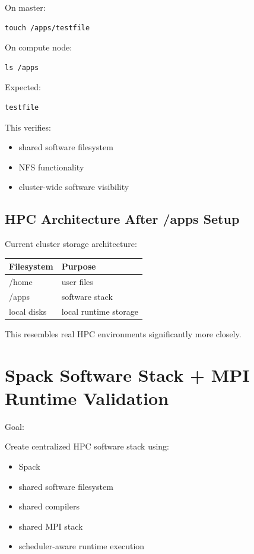 \documentclass[11pt]{article}
\begin{document}
On master:

\begin{verbatim}
touch /apps/testfile
\end{verbatim}

On compute node:

\begin{verbatim}
ls /apps
\end{verbatim}

Expected:

\begin{verbatim}
testfile
\end{verbatim}

This verifies:

\begin{itemize}
\item shared software filesystem
\item NFS functionality
\item cluster-wide software visibility
\end{itemize}
\subsection{HPC Architecture After /apps Setup}
\label{sec:orgbd76616}

Current cluster storage architecture:

\begin{center}
\begin{tabular}{ll}
Filesystem & Purpose\\
\hline
/home & user files\\
/apps & software stack\\
local disks & local runtime storage\\
\end{tabular}
\end{center}

This resembles real HPC environments significantly more closely.
\section{Spack Software Stack + MPI Runtime Validation}
\label{sec:org39005cc}

Goal:

Create centralized HPC software stack using:

\begin{itemize}
\item Spack
\item shared software filesystem
\item shared compilers
\item shared MPI stack
\item scheduler-aware runtime execution
\end{itemize}
\end{document}
